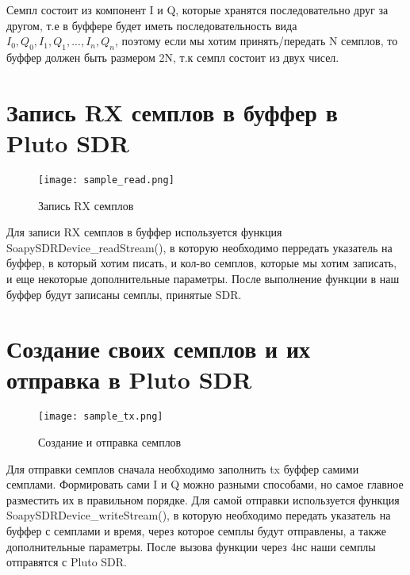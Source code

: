 Семпл состоит из компонент I и Q, которые хранятся последовательно друг за другом, т.е в буффере будет иметь последовательность вида $I_0, Q_0, I_1, Q_1, ... , I_n, Q_n$, поэтому
если мы хотим принять/передать N семплов, то буффер должен быть размером 2N, т.к семпл состоит из двух чисел.

\section*{\textbf{Запись RX семплов в буффер в Pluto SDR}}

\begin{figure}[H]
    \centering
    \texttt{[image: sample\_read.png]}
    \caption{Запись RX семплов}
\end{figure}

Для записи RX семплов в буффер используется функция SoapySDRDevice\_readStream(), в которую необходимо перредать указатель на буффер, в который хотим писать, и кол-во 
семплов, которые мы хотим записать, и еще некоторые дополнительные параметры. После выполнение функции в наш буффер будут записаны семплы, принятые SDR.

\section*{\textbf{Создание своих семплов и их отправка в Pluto SDR}}

\begin{figure}[H]
    \centering
    \texttt{[image: sample\_tx.png]}
    \caption{Создание и отправка семплов}
\end{figure}

Для отправки семплов сначала необходимо заполнить tx буффер самими семплами. Формировать сами I и Q можно разными способами, но самое главное разместить их в правильном порядке.
Для самой отправки используется функция SoapySDRDevice\_writeStream(), в которую необходимо передать указатель на буффер с семплами и время, через которое семплы будут
отправлены, а также дополнительные параметры. После вызова функции через 4нс наши семплы отправятся с Pluto SDR.


\endinput

